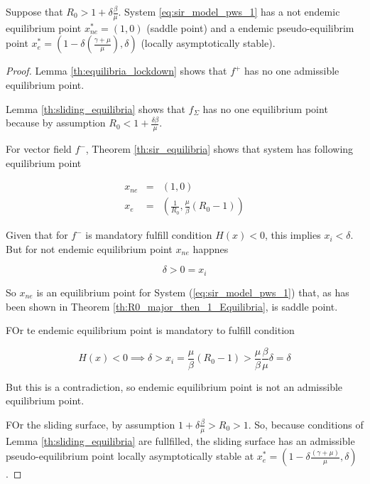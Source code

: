 \begin{theorem}
Suppose that $  R_0 > 1+\delta\frac{\beta}{\mu}$. System \ref{eq:sir_model_pws_1} has a not endemic equilibrium point $x_{ne}^*=(1,0)$ (saddle point) and a endemic pseudo-equilibrim point $x_{e}^*=\left(1-\delta\left(\frac{\gamma+\mu}{\mu}\right), \delta\right)$ (locally asymptotically stable).
\end{theorem}

\begin{proof}
Lemma \ref{th:equilibria_lockdown} shows that $f^+$ has no one admissible equilibrium point.

Lemma \ref{th:sliding_equilibria} shows that $f_\Sigma$ has no one equilibrium point because by assumption $R_0 < 1 + \frac{\delta\beta}{\mu}$.

For vector field $f^-$, Theorem \ref{th:sir_equilibria} shows that system has following equilibrium point

\begin{equation}
    \begin{array}{ccc}
    x_{ne} &=& (1,0) \\
    x_{e} &=& \left(\frac{1}{R_0}, \frac{\mu}{\beta}\left(R_0 - 1\right)\right)
    \end{array}
\end{equation}

Given that for $f^-$ is mandatory fulfill condition $H(x) < 0$, this implies $x_i < \delta$. But for not endemic equilibrium point $x_{ne}$ happnes

\begin{equation}
    \delta > 0 = x_i
\end{equation}

So $x_{ne}$ is an equilibrium point for System (\ref{eq:sir_model_pws_1}) that, as has been shown in Theorem \ref{th:R0_major_then_1_Equilibria}, is saddle point.

FOr te endemic equilibrium point is mandatory to fulfill condition

\begin{equation}
    H(x) < 0 \implies \delta > x_i = \frac{\mu}{\beta}\left(R_0 - 1\right) > \frac{\mu}{\beta}\frac{\beta}{\mu}\delta = \delta
\end{equation}

But this is a contradiction, so endemic equilibrium point is not an admissible equilibrium point.

FOr the sliding surface, by assumption $ 1+\delta\frac{\beta}{\mu} > R_0 > 1$. So, because conditions of Lemma \ref{th:sliding_equilibria} are fullfilled, the sliding surface has an admissible pseudo-equilibrium point locally asymptotically stable at $x_{e}^*=(1-\delta\frac{\left(\gamma+\mu\right)}{\mu},\delta)$.
\end{proof}